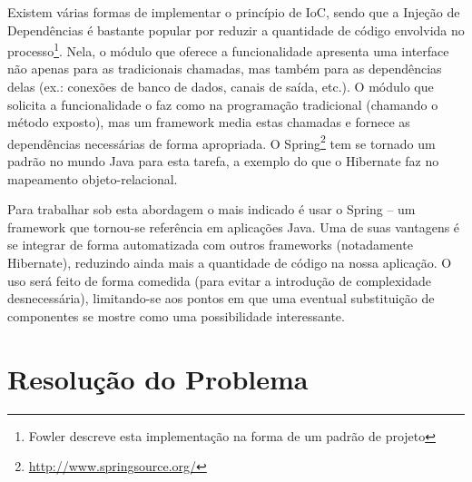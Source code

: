 \documentclass{abnt}
\begin{document}
Existem várias formas de implementar o princípio de IoC, sendo que a Injeção de Dependências é bastante popular por reduzir a quantidade de código envolvida no processo\footnote{Fowler descreve esta implementação na forma de um padrão de projeto\cite{FowlerInjdep}}. Nela, o módulo que oferece a funcionalidade apresenta uma interface não apenas para as tradicionais chamadas, mas também para as dependências delas (ex.: conexões de banco de dados, canais de saída, etc.). O módulo que solicita a funcionalidade o faz como na programação tradicional (chamando o método exposto), mas um framework media estas chamadas e fornece as dependências necessárias de forma apropriada. O Spring\footnote{\url{http://www.springsource.org/}} tem se tornado um padrão no mundo Java para esta tarefa, a exemplo do que o Hibernate faz no mapeamento objeto-relacional.

Para trabalhar sob esta abordagem o mais indicado é usar o Spring – um framework que tornou-se referência em aplicações Java. Uma de suas vantagens é se integrar de forma automatizada com outros frameworks (notadamente Hibernate), reduzindo ainda mais a quantidade de código na nossa aplicação. O uso será feito de forma comedida (para evitar a introdução de complexidade desnecessária), limitando-se aos pontos em que uma eventual substituição de componentes se mostre como uma possibilidade interessante.










\chapter{Resolução do Problema}
\end{document}
